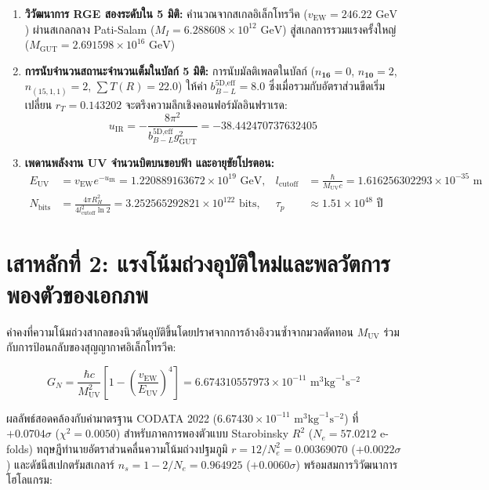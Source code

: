 \documentclass[11pt, a4paper]{article}
\begin{document}
\begin{enumerate}
    \item \textbf{วิวัฒนาการ RGE สองระดับใน 5 มิติ:} คำนวณจากสเกลอิเล็กโทรวีค ($v_{\text{EW}} = 246.22\text{ GeV}$) ผ่านสเกลกลาง Pati-Salam ($M_I = 6.288608 \times 10^{12}\text{ GeV}$) สู่สเกลการรวมแรงครั้งใหญ่ ($M_{\text{GUT}} = 2.691598 \times 10^{16}\text{ GeV}$)
    \item \textbf{การนับจำนวนสถานะจำนวนเต็มในบัลก์ 5 มิติ:} การนับมัลติเพลตในบัลก์ ($n_{\mathbf{16}} = 0$, $n_{\mathbf{10}} = 2$, $n_{(15,1,1)} = 2$, $\sum T(R) = 22.0$) ให้ค่า $b_{B-L}^{5\text{D,eff}} = 8.0$ ซึ่งเมื่อรวมกับอัตราส่วนขีดเริ่มเปลี่ยน $r_T = 0.143202$ จะตรึงความลึกเชิงคอนฟอร์มัลอินฟราเรด:
    \begin{equation}
    u_{\text{IR}} = -\frac{8\pi^2}{b_{B-L}^{5\text{D,eff}} g_{\text{GUT}}^2} = -38.442470737632405
    \end{equation}
    \item \textbf{เพดานพลังงาน UV จำนวนบิตบนขอบฟ้า และอายุขัยโปรตอน:}
    \begin{align}
    E_{\text{UV}} &= v_{\text{EW}} e^{-u_{\text{IR}}} = 1.220889163672 \times 10^{19}\text{ GeV}, &
    l_{\text{cutoff}} &= \frac{\hbar}{M_{\text{UV}} c} = 1.616256302293 \times 10^{-35}\text{ m} \\
    N_{\text{bits}} &= \frac{4\pi R_H^2}{4 l_{\text{cutoff}}^2 \ln 2} = 3.252565292821 \times 10^{122}\text{ bits}, &
    \tau_p &\approx 1.51 \times 10^{48}\text{ ปี}
    \end{align}
\end{enumerate}

\section{เสาหลักที่ 2: แรงโน้มถ่วงอุบัติใหม่และพลวัตการพองตัวของเอกภพ}

ค่าคงที่ความโน้มถ่วงสากลของนิวตันอุบัติขึ้นโดยปราศจากการอ้างอิงวนซ้ำจากมวลตัดทอน $M_{\text{UV}}$ ร่วมกับการป้อนกลับของสุญญากาศอิเล็กโทรวีค:

\begin{equation}
G_N = \frac{\hbar c}{M_{\text{UV}}^2} \left[ 1 - \left(\frac{v_{\text{EW}}}{E_{\text{UV}}}\right)^4 \right] = 6.674310557973 \times 10^{-11}\text{ m}^3\text{kg}^{-1}\text{s}^{-2}
\end{equation}

ผลลัพธ์สอดคล้องกับค่ามาตรฐาน CODATA 2022 ($6.67430 \times 10^{-11}\text{ m}^3\text{kg}^{-1}\text{s}^{-2}$) ที่ $+0.0704\sigma$ ($\chi^2 = 0.0050$) สำหรับภาคการพองตัวแบบ Starobinsky $R^2$ ($N_e = 57.0212$ e-folds) ทฤษฎีทำนายอัตราส่วนคลื่นความโน้มถ่วงปฐมภูมิ $r = 12/N_e^2 = 0.00369070$ ($+0.0022\sigma$) และดัชนีสเปกตรัมสเกลาร์ $n_s = 1 - 2/N_e = 0.964925$ ($+0.0060\sigma$) พร้อมสมการวิวัฒนาการโฮโลแกรม:
\end{document}
